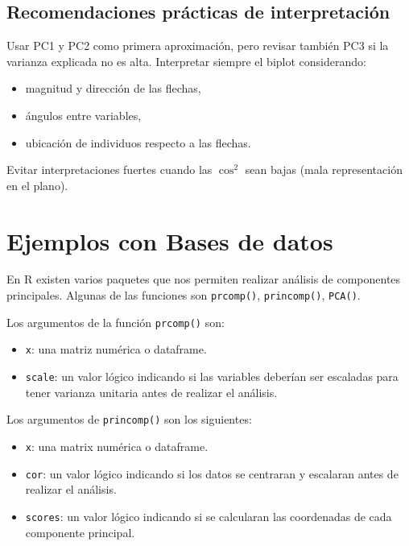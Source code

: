 \documentclass[
]{book}
\providecommand{\tightlist}{%
  \setlength{\itemsep}{0pt}\setlength{\parskip}{0pt}}
\begin{document}
\subsection{Recomendaciones prácticas de interpretación}\label{recomendaciones-pruxe1cticas-de-interpretaciuxf3n}

Usar PC1 y PC2 como primera aproximación, pero revisar también PC3 si la varianza explicada no es alta. Interpretar siempre el biplot considerando:

\begin{itemize}
\item
  magnitud y dirección de las flechas,
\item
  ángulos entre variables,
\item
  ubicación de individuos respecto a las flechas.
\end{itemize}

Evitar interpretaciones fuertes cuando las \(\cos^2\) sean bajas (mala representación en el plano).

\section{Ejemplos con Bases de datos}\label{ejemplos-con-bases-de-datos}

En R existen varios paquetes que nos permiten realizar análisis de componentes principales. Algunas de las funciones son \texttt{prcomp()}, \texttt{princomp()}, \texttt{PCA()}.

Los argumentos de la función \texttt{prcomp()} son:

\begin{itemize}
\tightlist
\item
  \texttt{x}: una matriz numérica o dataframe.
\item
  \texttt{scale}: un valor lógico indicando si las variables deberían ser escaladas para tener varianza unitaria antes de realizar el análisis.
\end{itemize}

Los argumentos de \texttt{princomp()} son los siguientes:

\begin{itemize}
\tightlist
\item
  \texttt{x}: una matrix numérica o dataframe.
\item
  \texttt{cor}: un valor lógico indicando si los datos se centraran y escalaran antes de realizar el análisis.
\item
  \texttt{scores}: un valor lógico indicando si se calcularan las coordenadas de cada componente principal.
\end{itemize}
\end{document}
